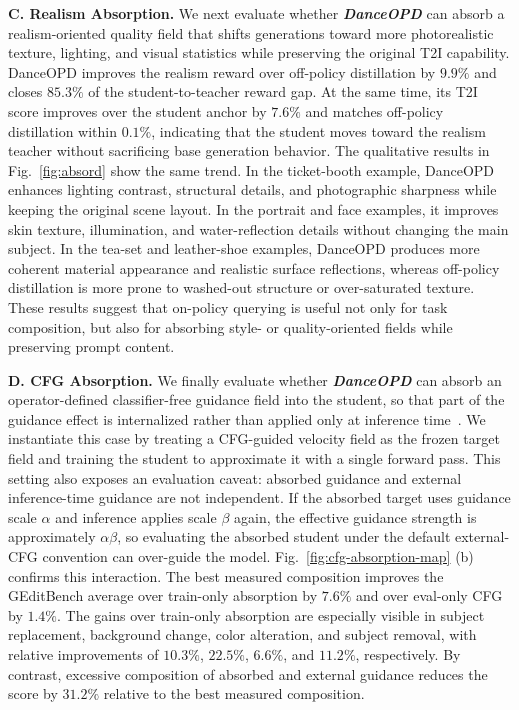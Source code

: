 \documentclass{llmxive}
\providecommand{\name}{\textsl{\textbf{DanceOPD}}\xspace}
\begin{document}
\noindent\textbf{C. Realism Absorption.}
We next evaluate whether \name{} can absorb a realism-oriented quality field that shifts generations toward more photorealistic texture, lighting, and visual statistics while preserving the original T2I capability. DanceOPD improves the realism reward over off-policy distillation by $9.9\%$ and closes $85.3\%$ of the student-to-teacher reward gap. At the same time, its T2I score improves over the student anchor by $7.6\%$ and matches off-policy distillation within $0.1\%$, indicating that the student moves toward the realism teacher without sacrificing base generation behavior. The qualitative results in Fig.~\ref{fig:absord} show the same trend. In the ticket-booth example, DanceOPD enhances lighting contrast, structural details, and photographic sharpness while keeping the original scene layout. In the portrait and face examples, it improves skin texture, illumination, and water-reflection details without changing the main subject. In the tea-set and leather-shoe examples, DanceOPD produces more coherent material appearance and realistic surface reflections, whereas off-policy distillation is more prone to washed-out structure or over-saturated texture. These results suggest that on-policy querying is useful not only for task composition, but also for absorbing style- or quality-oriented fields while preserving prompt content.

\noindent\textbf{D. CFG Absorption.}
We finally evaluate whether \name{} can absorb an operator-defined classifier-free guidance field into the student, so that part of the guidance effect is internalized rather than applied only at inference time~\cite{ho2022classifier}. We instantiate this case by treating a CFG-guided velocity field as the frozen target field and training the student to approximate it with a single forward pass. This setting also exposes an evaluation caveat: absorbed guidance and external inference-time guidance are not independent. If the absorbed target uses guidance scale $\alpha$ and inference applies scale $\beta$ again, the effective guidance strength is approximately $\alpha\beta$, so evaluating the absorbed student under the default external-CFG convention can over-guide the model. Fig.~\ref{fig:cfg-absorption-map} (b) confirms this interaction. The best measured composition improves the GEditBench average over train-only absorption by $7.6\%$ and over eval-only CFG by $1.4\%$. The gains over train-only absorption are especially visible in subject replacement, background change, color alteration, and subject removal, with relative improvements of $10.3\%$, $22.5\%$, $6.6\%$, and $11.2\%$, respectively. By contrast, excessive composition of absorbed and external guidance reduces the score by $31.2\%$ relative to the best measured composition.
\end{document}
